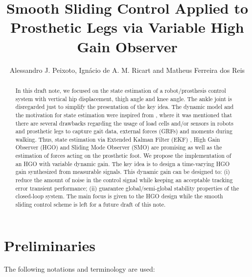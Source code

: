 \documentclass[letterpaper, 10 pt, conference]{ieeeconf}  %
\title{\LARGE \bf
Smooth Sliding Control Applied to Prosthetic Legs via Variable High Gain Observer}
\author{Alessandro J. Peixoto, %
        Ign\'{a}cio de A. M. Ricart and
        Matheus Ferreira dos Reis %
}
\theoremstyle{plain}
\theoremstyle{definition}
\theoremstyle{remark}
\begin{document}
\onecolumn

\maketitle
\thispagestyle{empty}
\pagestyle{empty}
\begin{abstract}%
In this draft note, we focused on the state estimation of a robot/prosthesis control system with vertical hip displacement, thigh angle and knee angle. The ankle joint is disregarded just to simplify the presentation of the key idea.  The dynamic model and the motivation for state estimation were inspired from \cite{Fakoorian2016, Azimi2015, Warner2016, Richter2015}, where it was mentioned that there are several drawbacks regarding the usage of load cells and/or sensors in robots and prosthetic legs to capture gait data, external forces (GRFs) and moments during walking. Thus, state estimation via Extended Kalman Filter (EKF) \cite{Fakoorian2016, Huang2009}, High Gain Observer (HGO) \cite{Zhang2016, Khalil2008, Foss2003} and  Sliding Mode Observer (SMO) are promising as well as the estimation of forces acting on the prosthetic foot. We propose the implementation of an HGO with variable dynamic gain. The key idea is to design a time-varying HGO gain synthesized from measurable signals. This dynamic gain can be designed to: (i) reduce the amount of noise in the control signal while keeping an acceptable tracking error  transient performance; (ii) guarantee global/semi-global stability properties of the closed-loop system. The main focus is given to the HGO design while the smooth sliding control scheme is left for a future draft of this note. 
\end{abstract}
\section{Preliminaries}


The following notations and terminology are used:%


\end{document}
